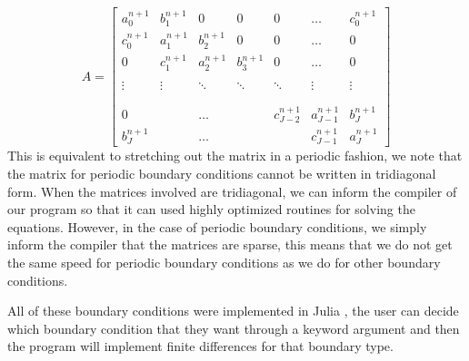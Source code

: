 \begin{equation}
A =
\begin{bmatrix}
	a_0^{n+1} & b_1^{n+1} & 0                & 0                & 0        & \dots                                 & c_0^{n+1}        \\
	c_0^{n+1} & a_1^{n+1} & b_2^{n+1} & 0                & 0        & \dots                                 & 0        \\
	0                & c_1^{n+1} & a_2^{n+1} & b_3^{n+1}   & 0        & \dots                                 & 0        \\
			     &                   &                   &                  &           &                                         &           \\
	\vdots         & \vdots         & \ddots         & \ddots         & \ddots & \vdots                              & \vdots \\
			     &                   &                   &                  &           &                                         &           \\
			     &                   &                   &                  &           &                                         &           \\
	0                &                   & \dots           &                   &  c_{J-2}^{n+1} & a_{J-1}^{n+1}  & b_J^{n+1} \\
	b_J^{n+1}                &                   & \dots           &                   &                         &  c_{J-1}^{n+1} & a_J^{n+1}
\end{bmatrix}
\end{equation}
This is equivalent to stretching out the matrix in a periodic fashion, we note that the matrix for periodic boundary conditions cannot be written in tridiagonal form. When the matrices involved are tridiagonal, we can inform the compiler of our program so that it can used highly optimized routines for solving the equations. However, in the case of periodic boundary conditions, we simply inform the compiler that the matrices are sparse, this means that we do not get the same speed for periodic boundary conditions as we do for other boundary conditions. 

All of these boundary conditions were implemented in Julia \cite{Bezanson2014}, the user can decide which boundary condition that they want through a keyword argument and then the program will implement finite differences for that boundary type.

